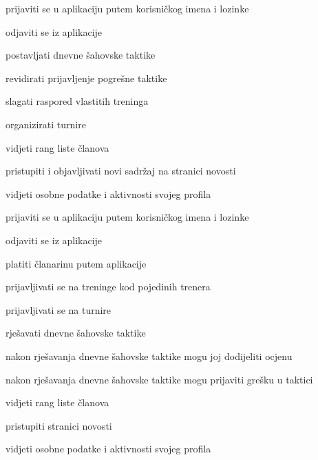 			
			\begin{packed_enum}
				\item  {}
				
				\begin{packed_enum}
					
					\item prijaviti se u aplikaciju putem korisničkog imena i lozinke
					\item odjaviti se iz aplikacije
					\item postavljati dnevne šahovske taktike
					\item revidirati prijavljenje pogrešne taktike
					\item slagati raspored vlastitih treninga
					\item organizirati turnire
					\item vidjeti rang liste članova
					\item pristupiti i objavljivati novi sadržaj na stranici novosti 
					\item vidjeti osobne podatke i aktivnosti svojeg profila
					
				\end{packed_enum}
			
				\item  {}
				
				\begin{packed_enum}
					
					\item prijaviti se u aplikaciju putem korisničkog imena i lozinke
					\item odjaviti se iz aplikacije
					\item platiti članarinu putem aplikacije
					\item prijavljivati se na treninge kod pojedinih trenera
					\item prijavljivati se na turnire
					\item rješavati dnevne šahovske taktike
					\begin{packed_enum}
						
						\item nakon rješavanja dnevne šahovske taktike mogu joj dodijeliti ocjenu
						\item nakon rješavanja dnevne šahovske taktike mogu prijaviti grešku u taktici
						
					\end{packed_enum}
					\item vidjeti rang liste članova
					\item pristupiti stranici novosti
					\item vidjeti osobne podatke i aktivnosti svojeg profila
					

\end{packed_enum}
\end{packed_enum}

